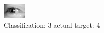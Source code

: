 \begin{figure}[h!]
\begin{center}
\includegraphics[width=0.60\columnwidth]{figures/ID3108_class_3_target_4.png}
\end{center}
\caption{ Classification: 3 actual target: 4}
\label{fig:ID3108_class_3_target_4}
\end{figure}
